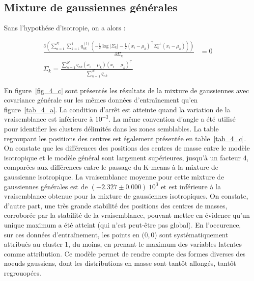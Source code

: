 \documentclass[12pt,a4paper,onecolumn]{article}
\begin{document}
\subsection{Mixture de gaussiennes générales}

Sans l'hypothése d'isotropie, on a alors :

\begin{equation}
	\begin{split}
		\frac{\partial\left(\sum_{n = 1}^N\sum_{k = 1}^4q_{nk}^{(t)}\left(
		-\frac{1}{2}\log|\Sigma_k|-\frac{1}{2}\left(x_i - \mu_k\right)^{\intercal}\Sigma_k^{-1}\left(x_i - \mu_k\right)\right)\right)}{\partial\Sigma_k} &= 0\\
		\Sigma_k = \frac{\sum_{n = 1}^Nq_{nk}\left(x_i-\mu_k\right)\left(x_i-\mu_k\right)^{\intercal}}{\sum_{n = 1}^Nq_{nk}}
	\end{split}
\end{equation}

En figure~\ref{fig_4_c} sont présentés les résultats de la mixture de gaussiennes avec covariance générale sur les mêmes données d'entraînement qu'en figure~\ref{tab_4_a}. La condition d'arrêt est atteinte quand la variation de la vraisemblance est inférieure à \(10^{-3}\). La même convention d'angle a été utilisé pour identifier les clusters délimités dans les zones semblables. La table regroupant les positions des centres est également présentée en table~\ref{tab_4_c}. On constate que les différences des positions des centres de masse entre le modèle isotropique et le modèle général sont largement supérieures, jusqu'à un facteur 4, comparées aux différences entre le passage du K-means à la mixture de gaussienne isotropique. La vraisemblance moyenne pour cette mixture de gaussiennes générales est de \((-2.327\pm0.000)~10^3\) et est inférieure à la vraisemblance obtenue pour la mixture de gaussiennes isotropiques. On constate, d'autre part, une très grande stabilité des positions des centres de masses, corroborée par la stabilité de la vraisemblance, pouvant mettre en évidence qu'un unique maximum a été atteint (qui n'est peut-être pas global). En l'occurence, sur ces données d'entraînement, les points en \((0,0\)) sont systématiquement attribués au cluster 1, du moins, en prenant le maximum des variables latentes comme attribution. Ce modèle permet de rendre compte des formes diverses des noeuds gaussiens, dont les distributions en masse sont tantôt allongés, tantôt regrouopées.
\end{document}
